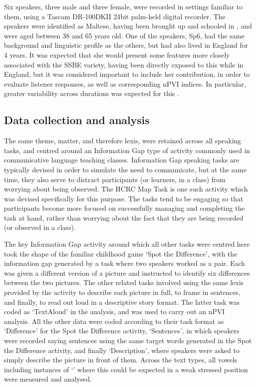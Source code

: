 \documentclass[output=paper]{langsci/langscibook}
\begin{document}
Six speakers, three male and three female, were recorded in settings familiar to them, using a Tascam DR-100DKII 24bit palm-held digital recorder. The speakers were identified as Maltese, having been brought up and schooled in , and were aged between 38 and 65 years old. One of the speakers, Sp6, had the same background and linguistic profile as the others, but had also lived in England for 4 years. It was expected that she would present some features more closely associated with the SSBE variety, having been directly exposed to this while in England, but it was considered important to include her contribution, in order to evaluate listener responses, as well as corresponding nPVI indices. In particular, greater variability across  durations was expected for this . 

\subsection{Data collection and analysis}
The same theme,  matter, and therefore lexis, were retained across all speaking tasks, and centred around an Information Gap type of activity commonly used in communicative language teaching classes. Information Gap speaking tasks are typically devised in order to simulate the need to communicate, but at the same time, they also serve to distract participants (or learners, in a class) from worrying about being observed. The HCRC Map Task \citep{Andersonetal1991} is one such activity which was devised specifically for this purpose. The tasks tend to be engaging so that participants become more focused on successfully managing and completing the task at hand, rather than worrying about the fact that they are being recorded (or observed in a class). 

The key Information Gap activity around which all other tasks were centred here took the shape of the familiar childhood game ‘Spot the Difference’, with the information gap generated by a task where two speakers worked as a pair. Each  was given a different version of a picture and instructed to identify six differences between the two pictures. The other related tasks involved using the same lexis provided by the activity to describe each picture in full, to frame in sentences, and finally, to read out loud in a descriptive story format. The latter task was coded as ‘TextAloud' in the analysis, and was used to carry out an nPVI analysis. All the other data were coded according to their task format as ‘Difference’ for the Spot the Difference activity, ‘Sentences’, in which speakers were recorded saying sentences using the same target words generated in the Spot the Difference activity, and finally ‘Description’, where speakers were asked to simply describe the picture in front of them. Across the text types, all vowels including instances of ‘’ where this could be expected in a weak stressed position were measured and analysed.  
\end{document}
